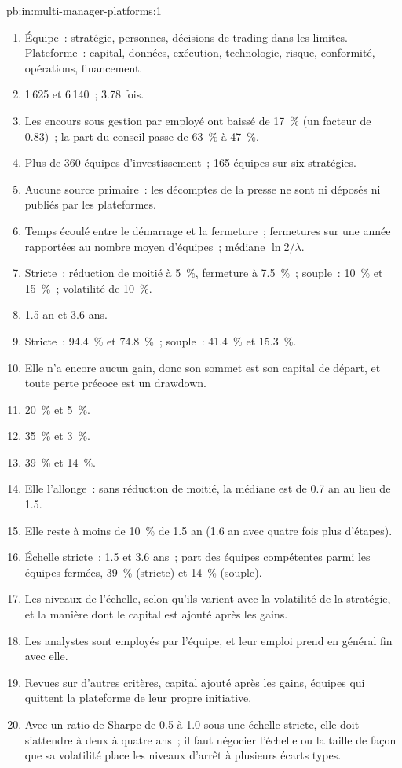 \begin{solution}{pb:in:multi-manager-platforms:1}
\begin{enumerate}
\item Équipe~: stratégie, personnes, décisions de trading dans les limites. Plateforme~: capital, données, exécution, technologie, risque,
conformité, opérations, financement.
\item 1\,625 et 6\,140~; 3.78 fois.
\item Les encours sous gestion par employé ont baissé de 17~\% (un facteur de 0.83)~; la part du conseil passe de 63~\% à 47~\%.
\item Plus de 360 équipes d'investissement~; 165 équipes sur six stratégies.
\item Aucune source primaire~: les décomptes de la presse ne sont ni déposés ni publiés par les plateformes.
\item Temps écoulé entre le démarrage et la fermeture~; fermetures sur une année rapportées au nombre moyen d'équipes~; médiane $\ln2/\lambda$.
\item Stricte~: réduction de moitié à 5~\%, fermeture à 7.5~\%~; souple~: 10~\% et 15~\%~; volatilité de 10~\%.
\item 1.5 an et 3.6 ans.
\item Stricte~: 94.4~\% et 74.8~\%~; souple~: 41.4~\% et 15.3~\%.
\item Elle n'a encore aucun gain, donc son sommet est son capital de départ, et toute perte précoce est un drawdown.
\item 20~\% et 5~\%.
\item 35~\% et 3~\%.
\item 39~\% et 14~\%.
\item Elle l'allonge~: sans réduction de moitié, la médiane est de 0.7 an au lieu de 1.5.
\item Elle reste à moins de 10~\% de 1.5 an (1.6 an avec quatre fois plus d'étapes).
\item Échelle stricte~: 1.5 et 3.6 ans~; part des équipes compétentes parmi les équipes fermées, 39~\% (stricte) et 14~\% (souple).
\item Les niveaux de l'échelle, selon qu'ils varient avec la volatilité de la stratégie, et la manière dont le capital est ajouté après les gains.
\item Les analystes sont employés par l'équipe, et leur emploi prend en général fin avec elle.
\item Revues sur d'autres critères, capital ajouté après les gains, équipes qui quittent la plateforme de leur propre initiative.
\item Avec un ratio de Sharpe de 0.5 à 1.0 sous une échelle stricte, elle doit s'attendre à deux à quatre ans~; il faut négocier
l'échelle ou la taille de façon que sa volatilité place les niveaux d'arrêt à plusieurs écarts types.
\end{enumerate}
\end{solution}

